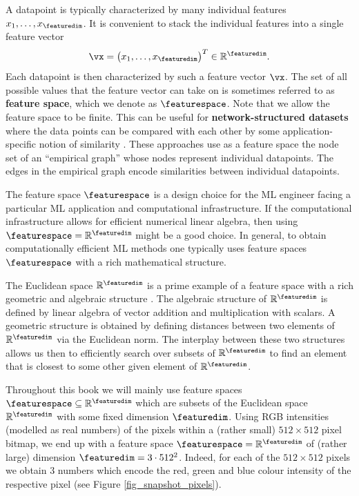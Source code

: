 \documentclass[12pt]{report}
\newcommand{\featurelen}{\featuredim}
\begin{document}
A datapoint is typically characterized by many individual features  $x_{1},\ldots,x_{\featuredim}$. 
It is convenient to stack the individual features into a single feature vector 
\begin{equation}
\nonumber 
\vx=\big(x_{1},\ldots,x_{\featuredim}\big)^{T} \in \mathbb{R}^{\featuredim}. 
\end{equation}
Each datapoint is then characterized by such a feature vector $\vx$. The set of 
all possible values that the feature vector can take on is sometimes referred to 
as {\bf feature space}, which we denote as $\featurespace$. Note that we 
allow the feature space to be finite. This can be useful for {\bf network-structured datasets} 
where the data points can be compared with each other by some application-specific 
notion of similarity \cite{WhenIsNLASSO,NNSPFrontiers2018,LogisticNLasso,JungTVMin2019}. 
These approaches use as a feature space the node set of an ``empirical graph'' whose 
nodes represent individual datapoints. The edges in the empirical graph encode 
similarities between individual datapoints. 

The feature space $\featurespace$ is a design choice for the ML engineer facing a 
particular ML application and computational infrastructure. If the computational 
infrastructure allows for efficient numerical linear algebra, then using $\featurespace = \mathbb{R}^{\featurelen}$ 
might be a good choice. In general, to obtain computationally efficient ML methods 
one typically uses feature spaces $\featurespace$ with a rich mathematical structure.
 
The Euclidean space $\mathbb{R}^{\featuredim}$ is a prime example of a feature space 
with a rich geometric and algebraic structure \cite{RudinBookPrinciplesMatheAnalysis}. 
The algebraic structure of $\mathbb{R}^{\featuredim}$ is defined by linear algebra of vector 
addition and multiplication with scalars. A geometric structure is obtained by defining 
distances between two elements of $\mathbb{R}^{\featuredim}$ via the Euclidean norm. 
The interplay between these two structures allows us then to efficiently search 
over subsets of $\mathbb{R}^{\featuredim}$ to find an element that is closest to 
some other given element of $\mathbb{R}^{\featurelen}$. 

Throughout this book we will mainly use feature spaces $\featurespace \subseteq \mathbb{R}^{\featuredim}$ 
which are subsets of the Euclidean space $\mathbb{R}^{\featuredim}$ with some fixed dimension $\featuredim$. 
Using RGB intensities (modelled as real numbers) of the pixels within a (rather small) $512 \times 512$ pixel bitmap, 
we end up with a feature space $\featurespace=\mathbb{R}^{\featuredim}$ of (rather large) dimension 
$\featuredim = 3 \cdot 512^2$. Indeed, for each of the $512 \times 512$ pixels we obtain $3$ numbers which 
encode the red, green and blue colour intensity of the respective pixel (see Figure \ref{fig_snapshot_pixels}). 
\end{document}
